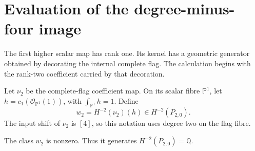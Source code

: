 \section{Evaluation of the degree-minus-four image}
\label{sch:sec:evaluation}

The first higher scalar map has rank one. Its kernel has a geometric
generator obtained by decorating the internal complete flag. The
calculation begins with the rank-two coefficient carried by that decoration.

Let $\nu_2$ be the complete-flag coefficient map. On its scalar
fibre $\mathbb P^1$, let $h=c_1(\mathcal O_{\mathbb P^1}(1))$,
with $\int_{\mathbb P^1}h=1$. Define
\[
 w_2=H^{-2}(\nu_2)(h)\in H^{-2}(P_{2,0}).
\]
The input shift of $\nu_2$ is $[4]$, so this notation uses degree
two on the flag fibre.

\begin{lemma}
\label{sch:lem:rank-two-decoration}
The class $w_2$ is nonzero. Thus it generates
$H^{-2}(P_{2,0})=\mathbb Q$.
\end{lemma}

